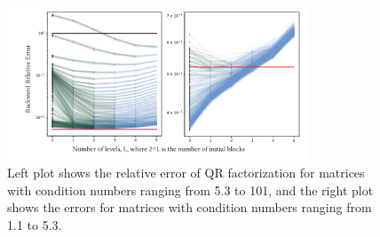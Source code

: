 \begin{figure}[h!]%
	\centering
	\includegraphics[width=0.8\textwidth]{./figures/allTSQR2.pdf}
	\caption{\label{fig:allTSQR} Left plot shows the relative error of QR factorization for matrices with condition numbers ranging from 5.3 to 101, and the right plot shows the errors for matrices with condition numbers ranging from 1.1 to 5.3. }
	\vspace{-10pt}
\end{figure} 
